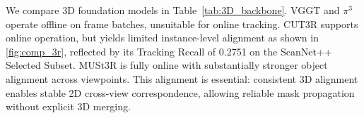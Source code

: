 We compare 3D foundation models in Table~\ref{tab:3D_backbone}. VGGT and $\pi^3$ operate offline on frame batches, unsuitable for online tracking. CUT3R supports online operation, but yields limited instance-level alignment as shown in \cref{fig:comp_3r}, reflected by its Tracking Recall of 0.2751 on the ScanNet++ Selected Subset. MUSt3R is fully online with substantially stronger object alignment across viewpoints. This alignment is essential: consistent 3D alignment enables stable 2D cross-view correspondence, allowing reliable mask propagation without explicit 3D merging.


